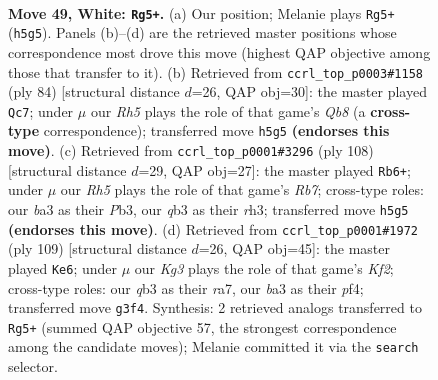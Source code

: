 \documentclass[11pt]{article}
\begin{document}
\clearpage

\begin{figure}[p]\centering
\begin{subfigure}{0.46\textwidth}\centering
\resizebox{\linewidth}{!}{%
\newchessgame
\chessboard[
  setfen={8/p5k1/8/1p3P1R/8/bq3BK1/8/8 w - - 0 49},
  showmover=false,
  pgfstyle=straightmove, color=movearrow, markmove={h5-g5}
]}
\caption{}
\end{subfigure}\hfill
\begin{subfigure}{0.46\textwidth}\centering
\resizebox{\linewidth}{!}{%
\newchessgame
\chessboard[
  setfen={1Q6/6bk/8/6qp/4P3/6B1/6K1/8 w - - 0 43},
  showmover=false,
  pgfstyle=straightmove, color=movearrow, markmove={b8-c7}
]}
\caption{}
\end{subfigure}
\\[4pt]
\begin{subfigure}{0.46\textwidth}\centering
\resizebox{\linewidth}{!}{%
\newchessgame
\chessboard[
  setfen={8/1R6/3k4/5bp1/8/1P2KB1r/8/8 w - - 2 55},
  showmover=false,
  pgfstyle=straightmove, color=movearrow, markmove={b7-b6}
]}
\caption{}
\end{subfigure}\hfill
\begin{subfigure}{0.46\textwidth}\centering
\resizebox{\linewidth}{!}{%
\newchessgame
\chessboard[
  setfen={8/R3bk2/1p6/8/1r3P2/3B2K1/8/8 b - - 0 55},
  showmover=false,
  pgfstyle=straightmove, color=movearrow, markmove={f7-e6}
]}
\caption{}
\end{subfigure}
\caption{\textbf{Move 49, White: \texttt{Rg5+}.} (a) Our position; Melanie plays \texttt{Rg5+} (\texttt{h5g5}). Panels (b)--(d) are the retrieved master positions whose correspondence most drove this move (highest QAP objective among those that transfer to it). (b) Retrieved from \texttt{ccrl\_top\_p0003\#1158} (ply 84) [structural distance $d$=26, QAP obj=30]: the master played \texttt{Qc7}; under $\mu$ our \emph{Rh5} plays the role of that game's \emph{Qb8} (a \textbf{cross-type} correspondence); transferred move \texttt{h5g5} \textbf{(endorses this move)}. (c) Retrieved from \texttt{ccrl\_top\_p0001\#3296} (ply 108) [structural distance $d$=29, QAP obj=27]: the master played \texttt{Rb6+}; under $\mu$ our \emph{Rh5} plays the role of that game's \emph{Rb7}; cross-type roles: our \emph{b}a3 as their \emph{P}b3, our \emph{q}b3 as their \emph{r}h3; transferred move \texttt{h5g5} \textbf{(endorses this move)}. (d) Retrieved from \texttt{ccrl\_top\_p0001\#1972} (ply 109) [structural distance $d$=26, QAP obj=45]: the master played \texttt{Ke6}; under $\mu$ our \emph{Kg3} plays the role of that game's \emph{Kf2}; cross-type roles: our \emph{q}b3 as their \emph{r}a7, our \emph{b}a3 as their \emph{p}f4; transferred move \texttt{g3f4}. Synthesis: 2 retrieved analogs transferred to \texttt{Rg5+} (summed QAP objective 57, the strongest correspondence among the candidate moves); Melanie committed it via the \texttt{search} selector.}
\label{fig:thought-m96}
\end{figure}
\end{document}
